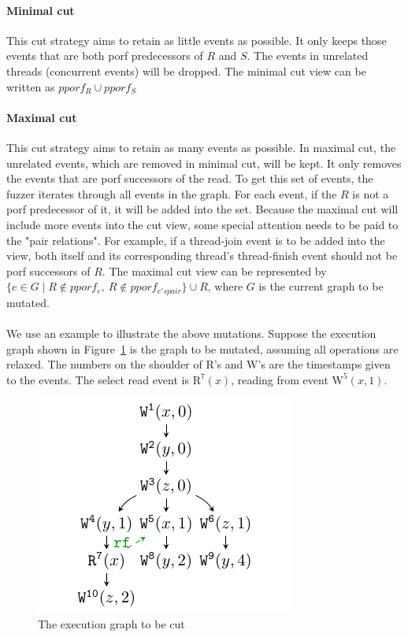 \paragraph{Minimal cut} This cut strategy aims to retain as little events as possible. It only keeps those events that are both porf predecessors of $R$ and $S$. The events in unrelated threads (concurrent events) will be dropped. The minimal cut view can be written as $pporf_{R} \cup pporf_{S}$

\paragraph{Maximal cut} This cut strategy aims to retain as many events as possible. In maximal cut, the unrelated events, which are removed in minimal cut, will be kept. It only removes the events that are porf successors of the read. To get this set of events, the fuzzer iterates through all events in the graph. For each event, if the $R$ is not a porf predecessor of it, it will be added into the set. Because the maximal cut will include more events into the cut view, some special attention needs to be paid to the "pair relations". For example, if a thread-join event is to be added into the view, both itself and its corresponding thread's thread-finish event should not be porf successors of $R$. The maximal cut view can be represented by $\{e \in G \mid R \notin pporf_e, \  R \notin pporf_{e's pair}\} \cup {R}$, where $G$ is the current graph to be mutated.



\paragraph{}We use an example to illustrate the above mutations. Suppose the execution graph shown in Figure~\ref{cut:to-be-cut} is the graph to be mutated, assuming all operations are relaxed. The numbers on the shoulder of $\text{R}$'s and $\text{W}$'s are the timestamps given to the events. The select read event is $\text{R}^7(x)$, reading from event $\text{W}^5(x, 1)$.

\begin{figure}[htbp]
	\centering
	\includegraphics[scale=1]{figure/cuts/cut.pdf}
	\caption{The execution graph to be cut}
	\label{cut:to-be-cut}
\end{figure}

